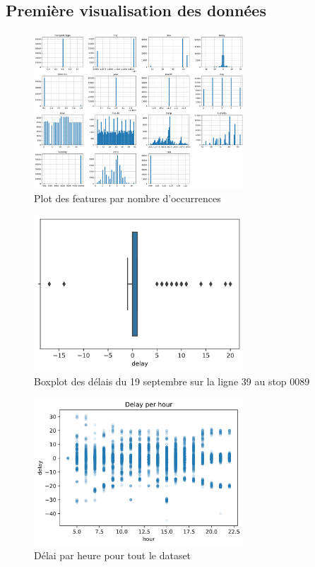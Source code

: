 \documentclass[12pt]{report}
\begin{document}
\begin{appendices}
    \chapter{Première visualisation des données}
    \begin{figure}[h]
        \centering
        \includegraphics[width=0.7\textwidth]{images/plots.png}
        \caption{Plot des features par nombre d'occurrences}
        \label{appendix:plots}
    \end{figure}

    \begin{figure}[h]
        \centering
        \includegraphics[width=0.7\textwidth]{images/boxplot.png}
        \caption{Boxplot des délais du 19 septembre sur la ligne 39 au stop 0089}
        \label{appendix:boxplot}
    \end{figure}

    \begin{figure}[h]
        \centering
        \includegraphics[width=0.7\textwidth]{images/delay_per_hour.png}
        \caption{Délai par heure pour tout le dataset}
        \label{appendix:delay_per_hour}
    \end{figure}


\end{appendices}
\end{document}
